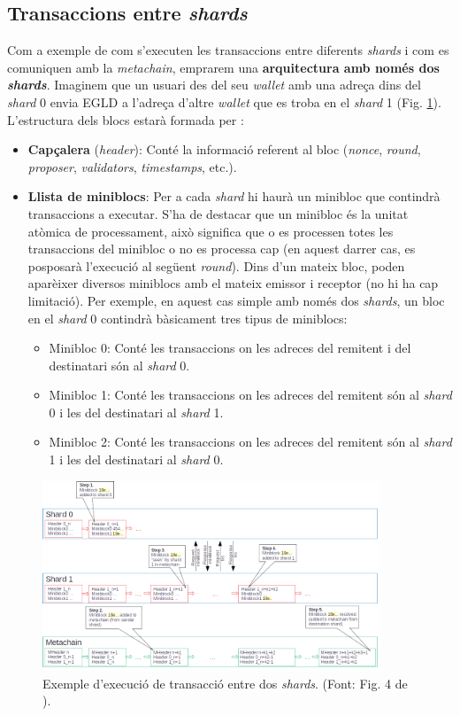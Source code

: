 \documentclass[11pt,a4paper]{article}
\begin{document}
\subsection{Transaccions entre \textit{shards}}\label{sec:transshards}
Com a exemple de com s'executen les transaccions entre diferents \textit{shards} i com es comuniquen amb la \textit{metachain}, emprarem una \textbf{arquitectura amb només dos \textit{shards}}. Imaginem que un usuari des del seu \textit{wallet} amb una adreça dins del \textit{shard} 0 envia EGLD a l'adreça d'altre \textit{wallet} que es troba en el \textit{shard} 1 (Fig. \ref{fig:shardingtrans}). L'estructura dels blocs estarà formada per \cite{elrond2019}:
\begin{itemize}
	\item \textbf{Capçalera} (\textit{header}): Conté la informació referent al bloc (\textit{nonce}, \textit{round}, \textit{proposer}, \textit{validators}, \textit{timestamps}, etc.).
	\item \textbf{Llista de miniblocs}: Per a cada \textit{shard} hi haurà un minibloc que contindrà transaccions a executar. 	S'ha de destacar que un minibloc és la unitat atòmica de processament, això significa que o es processen totes les transaccions del minibloc o no es processa cap (en aquest darrer cas, es posposarà l'execució al següent \textit{round}). Dins d'un mateix bloc, poden aparèixer diversos miniblocs amb el mateix emissor i receptor (no hi ha cap limitació). Per exemple, en aquest cas simple amb només dos \textit{shards}, un bloc en el \textit{shard} 0 contindrà bàsicament tres tipus de miniblocs:
	\begin{itemize}
		\item Minibloc 0: Conté les transaccions on les adreces del remitent i del destinatari són al \textit{shard} 0. 
		\item Minibloc 1: Conté les transaccions on les adreces del remitent són al \textit{shard} 0 i les del destinatari al \textit{shard} 1.
		\item Minibloc 2: Conté les transaccions on les adreces del remitent són al \textit{shard} 1 i les del destinatari al \textit{shard} 0.
	\end{itemize}
\end{itemize}

\begin{figure}[h]
\includegraphics[width=0.9\textwidth]{shardtrans.png}
\centering
\caption{Exemple d'execució de transacció entre dos \textit{shards}. (Font: Fig. 4 de \cite{elrond2019}).}
\label{fig:shardingtrans}
\end{figure}
\end{document}
